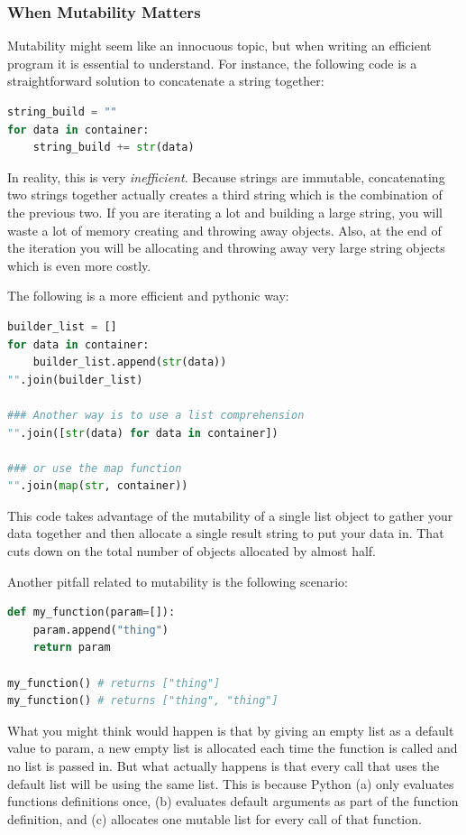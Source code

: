 \documentclass[../main.tex]{subfiles}
\begin{document}
\subsubsection{When Mutability Matters}
Mutability might seem like an innocuous topic, but when writing an efficient program it is essential to understand. For instance, the following code is a straightforward solution to concatenate a string together:
\begin{lstlisting}[language = Python]
string_build = ""
for data in container:
    string_build += str(data)
\end{lstlisting}
In reality, this is very \textit{inefficient}. Because strings are immutable, concatenating two strings together actually creates a third string which is the combination of the previous two. If you are iterating a lot and building a large string, you will waste a lot of memory creating and throwing away objects. Also, at the end of the iteration you will be allocating and throwing away very large string objects which is even more costly.

The following is a more efficient and pythonic way:
\begin{lstlisting}[language = Python]
builder_list = []
for data in container:
    builder_list.append(str(data))
"".join(builder_list)
 
### Another way is to use a list comprehension
"".join([str(data) for data in container])
 
### or use the map function
"".join(map(str, container))
\end{lstlisting}
This code takes advantage of the mutability of a single list object to gather your data together and then allocate a single result string to put your data in. That cuts down on the total number of objects allocated by almost half.

Another pitfall related to mutability is the following scenario:
\begin{lstlisting}[language = Python]
def my_function(param=[]):
    param.append("thing")
    return param
 
my_function() # returns ["thing"]
my_function() # returns ["thing", "thing"]
\end{lstlisting}

What you might think would happen is that by giving an empty list as a default value to param, a new empty list is allocated each time the function is called and no list is passed in. But what actually happens is that every call that uses the default list will be using the same list.  This is because Python (a) only evaluates functions definitions once, (b) evaluates default arguments as part of the function definition, and (c) allocates one mutable list for every call of that function.
\end{document}
